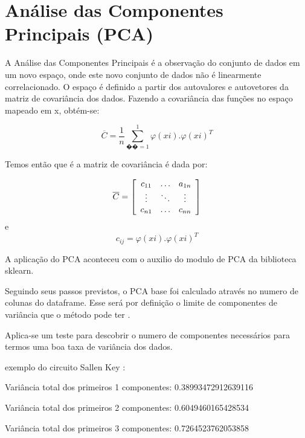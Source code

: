 \section{\textbf{Análise das Componentes Principais (PCA)}}

A Análise das Componentes Principais é a observação do conjunto de dados em um novo espaço, onde este novo conjunto de dados não é linearmente correlacionado. O espaço é definido a partir dos autovalores e autovetores da matriz de covariância dos dados.
Fazendo a covariância das funções no espaço mapeado em x, obtém-se:

\begin{equation}

    {\overline{C}=\frac{1}{n}\sum_{��=1}^{1}\varphi (xi).\varphi (xi)^{T}}
\end{equation}

Temos então que é a matriz de covariância é dada por:

\begin{equation}

\overline{C}=\left[
\begin{array}{c c c}
c_{11}&\ldots& a_{1n}\\
\vdots&\ddots &\vdots\\ c_{n1}&\ldots& c_{nn}
\end{array}\right]

\end{equation}
e
\begin{equation}
c_{ij}=\varphi (xi).\varphi (xi)^{T}

\end{equation}

A aplicação do PCA aconteceu com o auxilio do modulo de PCA da biblioteca sklearn. 


Seguindo seus passos previstos, o PCA base foi calculado através no numero de colunas do dataframe. Esse será por definição o limite de componentes de variância que o método pode ter \cite{pca}. 

Aplica-se um teste para descobrir o numero de componentes necessários para termos uma boa taxa de variância dos dados. 

exemplo do circuito Sallen Key : 

Variância total dos primeiros 1 componentes: 0.38993472912639116

Variância total dos primeiros 2 componentes: 0.6049460165428534

Variância total dos primeiros 3 componentes: 0.7264523762053858

